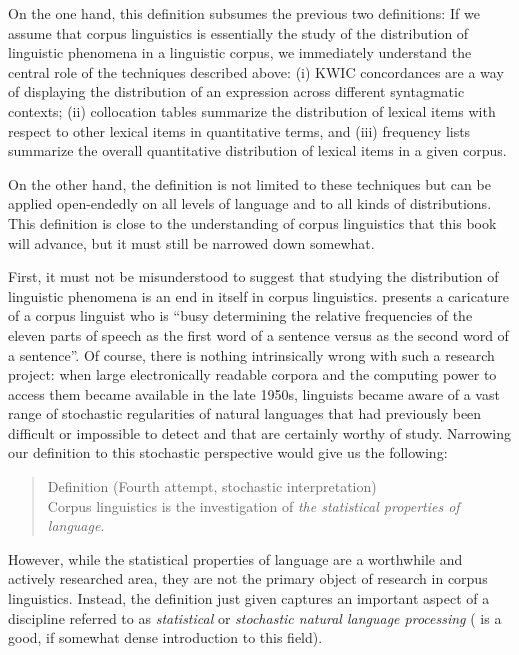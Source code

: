 On the one hand, this definition subsumes the previous two definitions: If we assume that corpus linguistics is essentially the study of the distribution  of linguistic phenomena in a linguistic corpus, we immediately understand the central role of the techniques described above: (i) KWIC  concordances  are a way of displaying the distribution of an expression across different syntagmatic  contexts; (ii) collocation  tables summarize the distribution of lexical items with respect to other lexical items in quantitative  terms, and (iii) frequency  lists summarize the overall quantitative distribution  of lexical items in a given corpus.

On the other hand, the definition is not limited to these techniques but can be applied open\hyp{}endedly on all levels of language and to all kinds of distributions.  This definition is close to the understanding of corpus linguistics that this book will advance, but it must still be narrowed down somewhat.

First, it must not be misunderstood to suggest that studying the distribution  of linguistic phenomena is an end in itself in corpus linguistics. \citet[35]{fillmore_corpus_1992} presents a caricature of a corpus linguist who is ``busy determining the relative frequencies  of the eleven parts of speech as the first word of a sentence versus as the second word of a sentence''. Of course, there is nothing intrinsically wrong with such a research project: when large  electronically readable corpora and the computing power to access them became available in the late 1950s, linguists became aware of a vast range of stochastic regularities of natural languages that had previously been difficult or impossible to detect and that are certainly worthy of study. Narrowing our definition to this stochastic perspective would give us the following:

\begin{quotation}
Definition (Fourth attempt, stochastic interpretation) \\
Corpus linguistics is the investigation of \textit{the statistical properties of language}.
\end{quotation}

However, while the statistical properties of language are a worthwhile and actively researched area, they are not the primary object of research in corpus linguistics. Instead, the definition just given captures an important aspect of a discipline referred to as \emph{statistical} or \emph{stochastic natural language processing} (\citealt{manning_foundations_1999} is a good, if somewhat dense introduction to this field).

